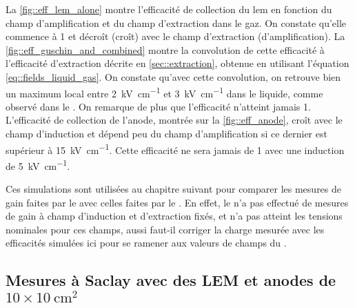       La \autoref{fig::eff_lem_alone} montre l'efficacité de collection du \gls{lem} en fonction du champ d'amplification et du champ d'extraction dans le gaz. On constate qu'elle commence à 1 et décroît (croît) avec le champ d'extraction (d'amplification). La \autoref{fig::eff_guschin_and_combined} montre la convolution de cette efficacité à l'efficacité d'extraction décrite en \autoref{sec::extraction}, obtenue en utilisant l'équation \eqref{eq::fields_liquid_gas}. On constate qu'avec cette convolution, on retrouve bien un maximum local entre \SI{2}{\kilo\volt\per\centi\meter} et \SI{3}{\kilo\volt\per\centi\meter} dans le liquide, comme observé dans le \threeL{}. On remarque de plus que l'efficacité n'atteint jamais 1. L'efficacité de collection de l'anode, montrée sur la \autoref{fig::eff_anode}, croît avec le champ d'induction et dépend peu du champ d'amplification si ce dernier est supérieur à \SI{15}{\kilo\volt\per\centi\meter}. Cette efficacité ne sera jamais de 1 avec une induction de \SI{5}{\kilo\volt\per\centi\meter}.

      Ces simulations sont utilisées au chapitre suivant pour comparer les mesures de gain faites par le \TOO{} avec celles faites par le \threeL{}. En effet, le \TOO{} n'a pas effectué de mesures de gain à champ d'induction et d'extraction fixés, et n'a pas atteint les tensions nominales pour ces champs, aussi faut-il corriger la charge mesurée avec les efficacités simulées ici pour se ramener aux valeurs de champs du \threeL{}.

    \subsection{Mesures à Saclay avec des LEM et anodes de \texorpdfstring{$10\times\SI{10}{\cm\squared}$}{10x10\;cm2} }

